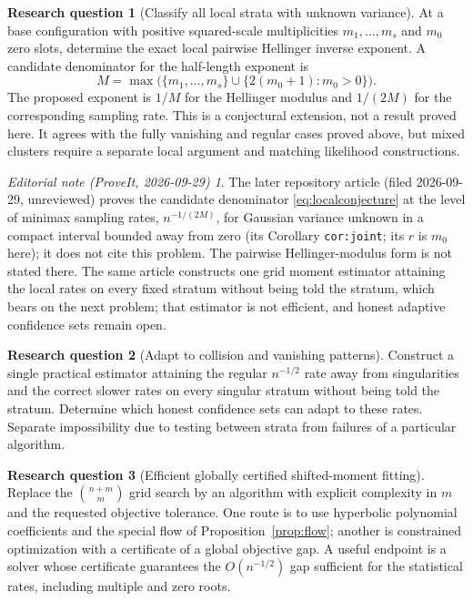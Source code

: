 \documentclass[11pt,a4paper]{article}
\numberwithin{equation}{section}
\theoremstyle{definition}
\newtheorem{problem}{Research question}
\theoremstyle{remark}
\newtheorem*{ednote}{Editorial note (ProveIt, 2026-09-29)}
\begin{document}
\begin{problem}[Classify all local strata with unknown variance]
At a base configuration with positive squared-scale multiplicities
$m_1,\ldots,m_s$ and $m_0$ zero slots, determine the exact local pairwise
Hellinger inverse exponent. A candidate denominator for the half-length
exponent is
\begin{equation}
 M=\max\bigl(\{m_1,\ldots,m_s\}\cup
                  \{2(m_0+1):m_0>0\}\bigr).
 \label{eq:localconjecture}
\end{equation}
The proposed exponent is $1/M$ for the Hellinger modulus and $1/(2M)$ for
the corresponding sampling rate. This is a conjectural extension, not a
result proved here. It agrees with the fully vanishing and regular cases
proved above, but mixed clusters require a separate local argument and
matching likelihood constructions.
\end{problem}
\begin{ednote}
The later repository article  (filed 2026-09-29, unreviewed)
proves the candidate denominator \eqref{eq:localconjecture} at the level of
minimax sampling rates, $n^{-1/(2M)}$, for Gaussian variance unknown in a
compact interval bounded away from zero (its Corollary \texttt{cor:joint};
its $r$ is $m_0$ here); it does not cite this problem. The pairwise
Hellinger-modulus form is not stated there. The same article constructs one
grid moment estimator attaining the local rates on every fixed stratum
without being told the stratum, which bears on the next problem; that
estimator is not efficient, and honest adaptive confidence sets remain open.
\end{ednote}

\begin{problem}[Adapt to collision and vanishing patterns]
Construct a single practical estimator attaining the regular $n^{-1/2}$ rate
away from singularities and the correct slower rates on every singular
stratum without being told the stratum. Determine which honest confidence
sets can adapt to these rates. Separate impossibility due to testing between
strata from failures of a particular algorithm.
\end{problem}

\begin{problem}[Efficient globally certified shifted-moment fitting]
Replace the $\binom{n+m}{m}$ grid search by an algorithm with explicit
complexity in $m$ and the requested objective tolerance. One route is to use
hyperbolic polynomial coefficients and the special flow of
Proposition~\ref{prop:flow}; another is constrained optimization with a
certificate of a global objective gap. A useful endpoint is a solver whose
certificate guarantees the $O(n^{-1/2})$ gap sufficient for the statistical
rates, including multiple and zero roots.
\end{problem}
\end{document}
